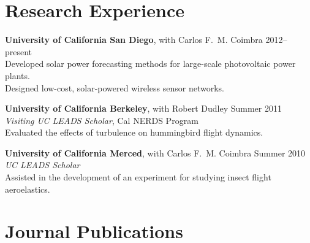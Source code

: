 \documentclass[10pt]{res}
\begin{document}
\begin{resume}
\section{Research Experience}
\vspace{0.1in}

\textbf{University of California San Diego}, with Carlos F.~M. Coimbra \hfill 2012--present\\
Developed solar power forecasting methods for large-scale photovoltaic power plants. \\
Designed low-cost, solar-powered wireless sensor networks.

\textbf{University of California Berkeley}, with Robert Dudley \hfill Summer 2011 \\
\textit{Visiting UC LEADS Scholar}, Cal NERDS Program \\
Evaluated the effects of turbulence on hummingbird flight dynamics.

\textbf{University of California Merced}, with Carlos F.~M. Coimbra \hfill Summer 2010 \\
\textit{UC LEADS Scholar} \\
Assisted in the development of an experiment for studying insect flight aeroelastics.


%
%

%


\section{Journal Publications}
\vspace{0.1in}


\end{resume}
\end{document}
